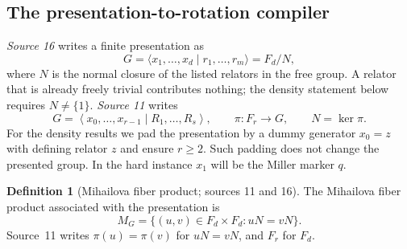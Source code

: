 \documentclass[11pt,letterpaper]{article}
\numberwithin{equation}{section}
\theoremstyle{definition}
\newtheorem{definition}[theorem]{Definition}
\theoremstyle{remark}
\newcommand{\pair}[1]{\left\langle #1\right\rangle}
\newcommand{\pres}[2]{\langle #1\mid #2\rangle}
\begin{document}
\subsection{The presentation-to-rotation compiler}
\label{pqc:rr:sec:compiler}\label{pqc:dr:sec:compiler}\label{pqc:gates:sec:compiler}
\emph{Source 16} writes a finite presentation as
\begin{equation}
 G=\pres{x_1,\ldots,x_d}{r_1,\ldots,r_m}=F_d/N,
 \label{pqc:dr:eq:presentation}
\end{equation}
where $N$ is the normal closure of the listed relators in the free group.
A relator that is already freely trivial contributes nothing; the density
statement below requires $N\ne\{1\}$.
\emph{Source 11} writes
\[
 G=\pair{x_0,\ldots,x_{r-1}\mid R_1,\ldots,R_s},\qquad
 \pi:F_r\longrightarrow G,\qquad N=\ker\pi.
\]
For the density results we pad the presentation by a dummy generator
$x_0=z$ with defining relator $z$ and ensure $r\geq2$. Such padding does
not change the presented group. In the hard instance $x_1$ will be the
Miller marker $q$.

\begin{definition}[Mihailova fiber product; sources 11 and 16]
The Mihailova fiber product associated with the presentation is
\begin{equation}
 M_G=\{(u,v)\in F_d\times F_d:uN=vN\}.
 \label{pqc:rr:eq:fiber}
\end{equation}
Source~11 writes $\pi(u)=\pi(v)$ for $uN=vN$, and $F_r$ for $F_d$.
\end{definition}
\end{document}
